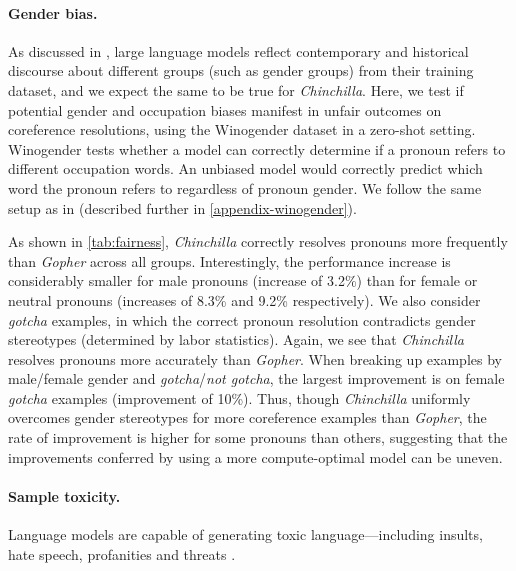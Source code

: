 \paragraph{Gender bias.} As discussed in \citet{rae2021gopher}, large language models reflect contemporary and historical discourse about different groups (such as gender groups) from their training dataset, and we expect the same to be true for \textit{Chinchilla}. 
Here, we test if potential gender and occupation biases manifest in unfair outcomes on coreference resolutions, using the Winogender dataset \citep{rudinger2018gender} in a zero-shot setting. Winogender tests whether a model can correctly determine if a pronoun refers to different occupation words. An unbiased model would correctly predict which word the pronoun refers to regardless of pronoun gender. We follow the same setup as in \citet{rae2021gopher} (described further in \autoref{appendix-winogender}).

As shown in \autoref{tab:fairness}, \textit{Chinchilla} correctly resolves pronouns more frequently than \textit{Gopher} across all groups. Interestingly, the performance increase is considerably smaller for male pronouns (increase of 3.2\%) than for female or neutral pronouns (increases of 8.3\% and 9.2\% respectively). We also consider \textit{gotcha} examples, in which the correct pronoun resolution contradicts gender stereotypes (determined by labor statistics).  Again, we see that \textit{Chinchilla} resolves pronouns more accurately than \textit{Gopher}.  When breaking up examples by male/female gender and \textit{gotcha}/\textit{not gotcha}, the largest improvement is on female \textit{gotcha} examples (improvement of 10\%).
Thus, though \textit{Chinchilla} uniformly overcomes gender stereotypes for more coreference examples than \textit{Gopher}, the rate of improvement is higher for some pronouns than others, suggesting that the improvements conferred by using a more compute-optimal model can be uneven.

\paragraph{Sample toxicity.} Language models are capable of generating toxic language---including insults, hate speech, profanities and threats \citep{gehman2020realtoxicityprompts,rae2021gopher}.

